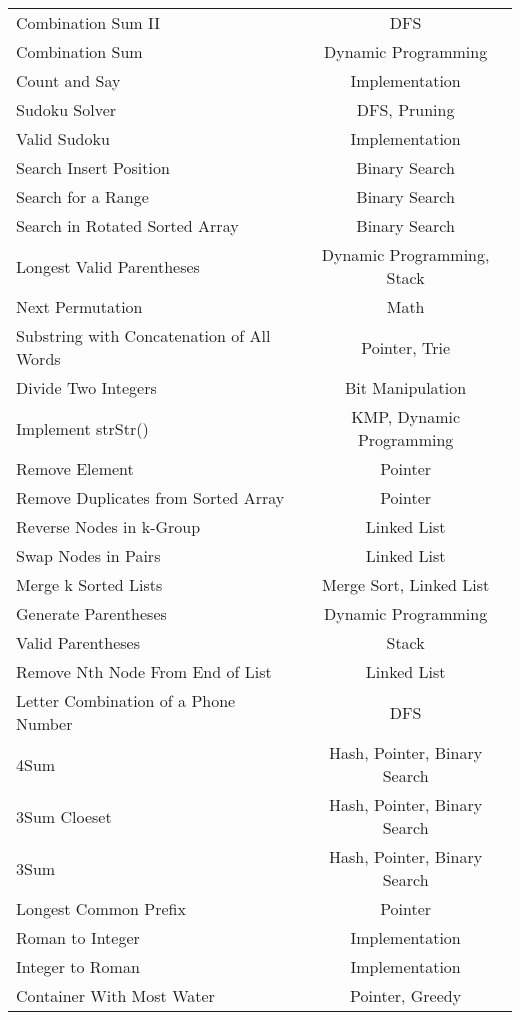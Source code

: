 \documentclass[paper=a4, fontsize=11pt]{scrartcl} %
\begin{document}
\begin{center}
\begin{longtable}{|l|c|}
    Combination Sum II  &   DFS  \\
    Combination Sum &   Dynamic Programming \\
    Count and Say   &   Implementation  \\
    Sudoku Solver   &   DFS, Pruning \\
    Valid Sudoku    &   Implementation \\
    Search Insert Position  &   Binary Search   \\
    Search for a Range  &   Binary Search   \\
    Search in Rotated Sorted Array  &   Binary Search   \\
    Longest Valid Parentheses   &   Dynamic Programming, Stack   \\
    Next Permutation    &   Math    \\
    Substring with Concatenation of All Words   &   Pointer, Trie \\
    Divide Two Integers &   Bit Manipulation    \\
    Implement strStr()  &   KMP, Dynamic Programming  \\
    Remove Element  &   Pointer \\
    Remove Duplicates from Sorted Array &   Pointer \\
    Reverse Nodes in k-Group    &   Linked List \\
    Swap Nodes in Pairs     &   Linked List \\
    Merge k Sorted Lists    &   Merge Sort, Linked List\\
    Generate Parentheses    &   Dynamic Programming \\
    Valid Parentheses   &   Stack   \\
    Remove Nth Node From End of List    &   Linked List \\
    Letter Combination of a Phone Number    &   DFS \\
    4Sum    &   Hash, Pointer, Binary Search \\
    3Sum Cloeset    &   Hash, Pointer, Binary Search \\
    3Sum    &   Hash, Pointer, Binary Search \\
    Longest Common Prefix   &   Pointer \\
    Roman to Integer    &   Implementation  \\
    Integer to Roman    &   Implementation  \\
    Container With Most Water   &   Pointer, Greedy\\

\end{longtable}
\end{center}
\end{document}
